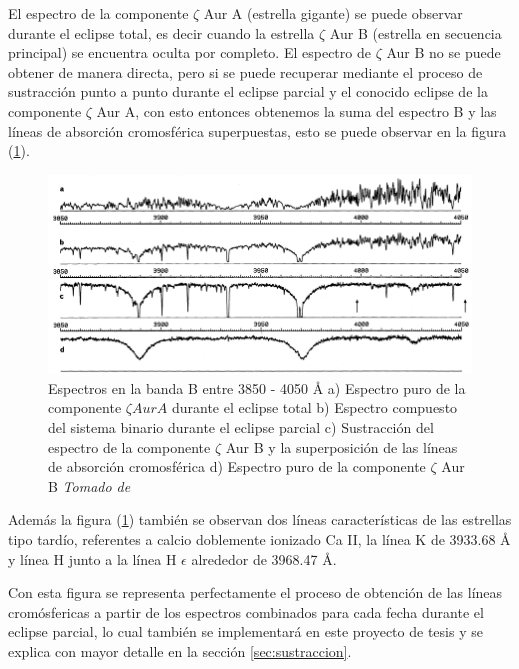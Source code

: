 \documentclass[12pt,oneside,openany,letter]{book}
\begin{document}
El espectro de la componente $\zeta$ Aur A (estrella gigante) se puede observar durante el eclipse total, es decir cuando la estrella $\zeta$ Aur B (estrella en secuencia principal) se encuentra oculta por completo. El espectro de $\zeta$ Aur B no se puede obtener de manera directa, pero si se puede recuperar mediante el proceso de sustracción punto a punto durante el eclipse parcial y el conocido eclipse de la componente $\zeta$ Aur A, con esto entonces obtenemos la suma del espectro B y las líneas de absorción cromosférica superpuestas, esto se puede observar en la figura (\ref{fig:espectro_zaur}).


\begin{figure}[h]
    \centering
    \includegraphics[width=1\linewidth]{Images/espectro_zeta_aur.PNG}
    \caption{Espectros en la banda B entre 3850 - 4050 \r{A} a) Espectro puro de la componente $\zeta Aur A$ durante el eclipse total b) Espectro compuesto del sistema binario durante el eclipse parcial c) Sustracción del espectro de la componente $\zeta$ Aur B y la superposición de las líneas de absorción cromosférica d) Espectro puro de la componente $\zeta$ Aur B \textit{Tomado de \citep{kps9}}}
    \label{fig:espectro_zaur}
\end{figure}

\noindent Además la figura (\ref{fig:espectro_zaur}) también se observan dos líneas características de las estrellas tipo tardío, referentes a calcio doblemente ionizado Ca II, la línea K de 3933.68 \r{A} y línea H junto a la línea H $\epsilon$ alrededor de 3968.47 \r{A}. 

Con esta figura se representa perfectamente el proceso de obtención de las líneas cromósfericas a partir de los espectros combinados para cada fecha durante el eclipse parcial, lo cual también se implementará en este proyecto de tesis y se explica con mayor detalle en la sección \ref{sec:sustraccion}.
\end{document}
